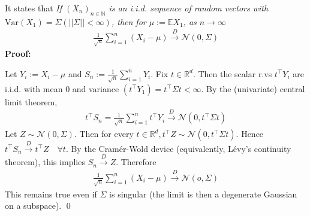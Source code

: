 \documentclass[10pt]{article}
\begin{document}
It states that \textit{If $(X_n)_{n\in \mathbb{N}}$ is an i.i.d. sequence of random vectors with $\text{Var}(X_1) = \Sigma (||\Sigma|| < \infty) $, then for $\mu := \mathbb{E}X_1 $, as $n \to \infty $}
\begin{gather*}
    \frac{1}{\sqrt{n}}\sum_{i = 1}^{n}(X_i - \mu) \xrightarrow{D}\mathcal{N}(0, \Sigma)
\end{gather*}
\textbf{Proof:}

Let $Y_i := X_i - \mu $ and $S_n := \frac{1}{\sqrt{n}}\sum_{i = 1}^{n}Y_i $. Fix $t \in \mathbb{R}^d $. Then the scalar r.vs $t^\top Y_i $ are i.i.d. with mean $0 $ and variance $(t^\top Y_1)=t^\top\Sigma t<\infty$. By the (univariate) central limit theorem,
\begin{gather*}
    t^\top S_n = \frac{1}{\sqrt{n}}\sum_{i = 1}^{n}t^\top Y_i \xrightarrow{D} \mathcal{N}(0, t^\top\Sigma t)
\end{gather*}
Let $Z \sim \mathcal{N}(0, \Sigma)$. Then for every $t \in \mathbb{R}^d, t^\top Z \sim \mathcal{N}(0, t^\top\Sigma t)$. Hence $t^\top S_n \xrightarrow{D}t^\top Z\quad\forall t $. By the Cramér-Wold device (equivalently, Lévy's continuity theorem), this implies $S_n \xrightarrow{D}Z $. Therefore 
\begin{gather*}
    \frac{1}{\sqrt{n}}\sum_{i = 1}^{n}(X_i - \mu) \xrightarrow{D}\mathcal{N}(o, \Sigma)
\end{gather*}
This remains true even if $\Sigma $ is singular (the limit is then a degenerate Gaussian on a subspace). \qed
\end{document}
